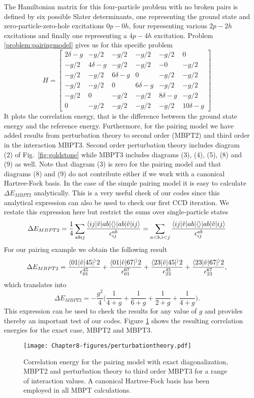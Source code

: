 \documentclass[thesis.tex]{subfiles}
\begin{document}
The Hamiltonian matrix for this four-particle problem with no broken pairs is defined by six possible Slater determinants, one representing the ground state and zero-particle-zero-hole excitations $0p-0h$, four representing various $2p-2h$ excitations and finally one representing a $4p-4h$ excitation. Problem \ref{problem:pairingmodel} gives us for this specific problem
\begin{equation}
  H = \begin{bmatrix}
    2\delta -g & -g/2 & -g/2 & -g/2 & -g/2 & 0 \\ -g/2 & 4\delta -g &
    -g/2 & -g/2 & -0 & -g/2 \\ -g/2 & -g/2 & 6\delta -g & 0 & -g/2 &
    -g/2 \\ -g/2 & -g/2 & 0 & 6\delta-g & -g/2 & -g/2 \\ -g/2 & 0 & -g/2
    & -g/2 & 8\delta-g & -g/2 \\ 0 & -g/2 & -g/2 & -g/2 & -g/2 &
    10\delta -g
  \end{bmatrix}
\end{equation}
It plots the correlation energy, that is the difference between the ground state energy and the reference energy. Furthermore, for the pairing model we have added results from perturbation theory to second order (MBPT2)
and third order in the interaction MBPT3. Second order perturbation theory includes diagram (2) of Fig.~\ref{fig:goldstone} while MBPT3 includes diagrams (3), (4), (5), (8) and (9) as well. Note that diagram (3) is zero for the pairing model and that diagrams (8) and (9) do not contribute either if we work with a canonical Hartree-Fock basis. In the case of the simple pairing model it is easy to calculate $\Delta E_{MBPT2}$ analytically. This is a very useful  check of our codes since this analytical expression  can  also be used to check our first CCD iteration. We restate this expression here but restrict the sums over single-particle states
\[
\Delta E_{MBPT2} = \frac{1}{4} \sum_{abij} \frac{\langle ij|\hat{v}|ab | \langle \rangle | ab|\hat{v}|ij\rangle}{ \epsilon_{ij}^{ab}} = \sum_{a<b,i<j}
\frac{\langle ij|\hat{v}|ab | \langle \rangle | ab|\hat{v}|ij\rangle}{ \epsilon_{ij}^{ab}}
\]
For our pairing example we obtain the following result
\[
\Delta E_{MBPT2} = \frac{\langle 01|\hat{v}|45 | ^\rangle2}{\epsilon_{01}^{45}} +
\frac{\langle 01|\hat{v}|67 | ^\rangle2}{\epsilon_{01}^{67}} +
\frac{\langle 23|\hat{v}|45 | ^\rangle2}{\epsilon_{23}^{45}} +
\frac{\langle 23|\hat{v}|67 | ^\rangle2}{\epsilon_{23}^{67}},
\]
which translates into
\[
\Delta E_{MBPT2} = -\frac{g^2}{4} \bigg( \frac{1}{ 4 + g} +
\frac{1}{ 6 + g} + \frac{1}{ 2 + g} + \frac{1}{ 4 + g} \bigg).
\]
This expression can be used to check the results
for any value of $g$ and provides thereby an important test of  our codes.
Figure \ref{fig:diagpairing} shows the resulting correlation energies for the exact case, MBPT2 and MBPT3.
\begin{figure}
  \texttt{[image: Chapter8-figures/perturbationtheory.pdf]}
  \caption{Correlation energy for the pairing model with exact diagonalization, MBPT2 and perturbation theory to third order MBPT3 for a range of interaction values. A canonical Hartree-Fock basis has been employed in all MBPT calculations.}
  \label{fig:diagpairing}
\end{figure}
\end{document}
